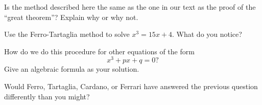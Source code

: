 \documentclass[nooutcomes]{ximera}
\begin{document}
\begin{question}
Is the method described here the same as the one in our text as the proof of the ``great theorem''?  Explain why or why not.
\end{question}

\begin{question}
Use the Ferro-Tartaglia method to solve $x^3 = 15x + 4$.  What do you notice?
\end{question}



\begin{question} How do we do this procedure for other equations of the form
\[
x^3 + px + q = 0?
\]
Give an algebraic formula as your solution.
\end{question}



\begin{question}
Would Ferro, Tartaglia, Cardano, or Ferrari have answered the previous question differently than you might?
\end{question}
\end{document}
